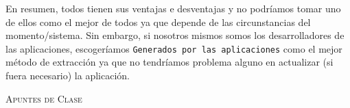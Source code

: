 En resumen, todos tienen sus ventajas e desventajas y no podríamos tomar uno de ellos como el mejor de todos ya que depende de las circunstancias del momento/sistema. Sin embargo, si nosotros mismos somos los desarrolladores de las aplicaciones, escogeríamos \texttt{Generados por las aplicaciones} como el mejor método de extracción ya que no tendríamos problema alguno en actualizar (si fuera necesario) la aplicación.


\newpage
\begin{thebibliography}{X}

 \textsc{Apuntes de Clase}

\end{thebibliography}




